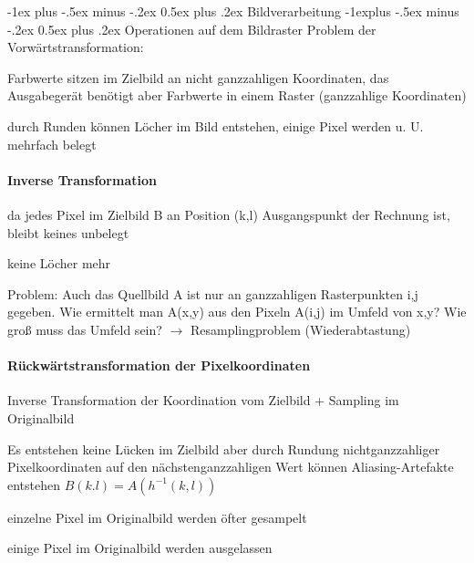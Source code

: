 \documentclass[landscape]{article}
\makeatletter
\renewcommand{\section}{\@startsection{section}{1}{0mm}%
                                {-1ex plus -.5ex minus -.2ex}%
                                {0.5ex plus .2ex}%
                                {\normalfont\large\bfseries}}
\renewcommand{\subsection}{\@startsection{subsection}{2}{0mm}%
                                {-1explus -.5ex minus -.2ex}%
                                {0.5ex plus .2ex}%
                                {\normalfont\normalsize\bfseries}}
\makeatother
\begin{document}
\newpage
\begin{multicols}{3}
  \section{Bildverarbeitung}
  \subsection{Operationen auf dem Bildraster}
  Problem der Vorwärtstransformation:
  \begin{itemize*}
    \item Farbwerte sitzen im Zielbild an nicht ganzzahligen Koordinaten, das Ausgabegerät benötigt aber Farbwerte in einem Raster (ganzzahlige Koordinaten)
    \item durch Runden können Löcher im Bild entstehen, einige Pixel werden u. U. mehrfach belegt
  \end{itemize*}
  
  \paragraph{Inverse Transformation}
  \begin{itemize*}
    \item da jedes Pixel im Zielbild B an Position (k,l) Ausgangspunkt der Rechnung ist, bleibt keines unbelegt
    \item keine Löcher mehr
    \item Problem: Auch das Quellbild A ist nur an ganzzahligen Rasterpunkten i,j gegeben. Wie ermittelt man A(x,y) aus den Pixeln A(i,j) im Umfeld von x,y? Wie groß muss das Umfeld sein? $\rightarrow$ Resamplingproblem (Wiederabtastung)
  \end{itemize*}
  
  \paragraph{Rückwärtstransformation der Pixelkoordinaten}
  \begin{itemize*}
    \item Inverse Transformation der Koordination vom Zielbild + Sampling im Originalbild
    \item Es entstehen keine Lücken im Zielbild aber durch Rundung nichtganzzahliger Pixelkoordinaten auf den nächstenganzzahligen Wert können Aliasing-Artefakte entstehen $B(k.l)=A(h^{-1}(k,l))$
    \begin{itemize*}
      \item einzelne Pixel im Originalbild werden öfter gesampelt
      \item einige Pixel im Originalbild werden ausgelassen
    \end{itemize*}
  \end{itemize*}
  

\end{multicols}
\end{document}
